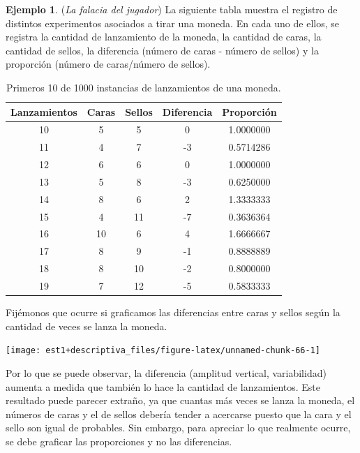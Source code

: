 \documentclass[
  11pt,
]{book}
\theoremstyle{definition}
\theoremstyle{definition}
\newtheorem{example}{Ejemplo}[chapter]
\theoremstyle{definition}
\theoremstyle{definition}
\theoremstyle{remark}
\begin{document}
\begin{example}
\protect\hypertarget{exm:falaciadeljugador}{}\label{exm:falaciadeljugador}(\emph{La falacia del jugador}) La siguiente tabla muestra el registro de distintos experimentos asociados a tirar una moneda. En cada uno de ellos, se registra la cantidad de lanzamiento de la moneda, la cantidad de caras, la cantidad de sellos, la diferencia (número de caras - número de sellos) y la proporción (número de caras/número de sellos).

\begin{table}[H]
\centering
\caption{\label{tab:unnamed-chunk-65}Primeros 10 de 1000 instancias de lanzamientos de una moneda.}
\centering
\begin{tabular}[t]{ccccc}
\toprule
Lanzamientos & Caras & Sellos & Diferencia & Proporción\\
\midrule
10 & 5 & 5 & 0 & 1.0000000\\
11 & 4 & 7 & -3 & 0.5714286\\
12 & 6 & 6 & 0 & 1.0000000\\
13 & 5 & 8 & -3 & 0.6250000\\
14 & 8 & 6 & 2 & 1.3333333\\
15 & 4 & 11 & -7 & 0.3636364\\
16 & 10 & 6 & 4 & 1.6666667\\
17 & 8 & 9 & -1 & 0.8888889\\
18 & 8 & 10 & -2 & 0.8000000\\
19 & 7 & 12 & -5 & 0.5833333\\
\bottomrule
\end{tabular}
\end{table}

Fijémonos que ocurre si graficamos las diferencias entre caras y sellos según la cantidad de veces se lanza la moneda.

\begin{center}\texttt{[image: est1+descriptiva\_files/figure-latex/unnamed-chunk-66-1]} \end{center}

Por lo que se puede observar, la diferencia (amplitud vertical, variabilidad) aumenta a medida que también lo hace la cantidad de lanzamientos. Este resultado puede parecer extraño, ya que cuantas más veces se lanza la moneda, el números de caras y el de sellos debería tender a acercarse puesto que la cara y el sello son igual de probables. Sin embargo, para apreciar lo que realmente ocurre, se debe graficar las proporciones y no las diferencias.


\end{example}
\end{document}
